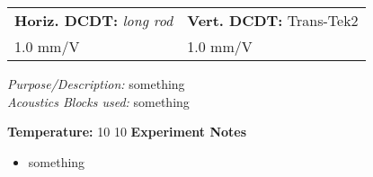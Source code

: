 \documentclass[letterpaper,10pt]{article}
\begin{document}
\begin{tabular}{ p{11cm} p{10cm} }
\small
    \textbf{Horiz. DCDT:} \textit{long rod} & \textbf{Vert. DCDT: }Trans-Tek2 \\
    1.0 mm/V &1.0 mm/V
\end{tabular}
 \smallskip 

\small
\textit{Purpose/Description: }something\\ 
 
\textit{Acoustics Blocks used: }something

\textbf{Temperature: }10	10
\newpage 
 \textbf{Experiment Notes}
 \medskip
 {\small \begin{itemize}[label=\#]
 \setlength\itemsep{0.25em}
 	 \item something
 \end{itemize}} 

 
\end{document}
